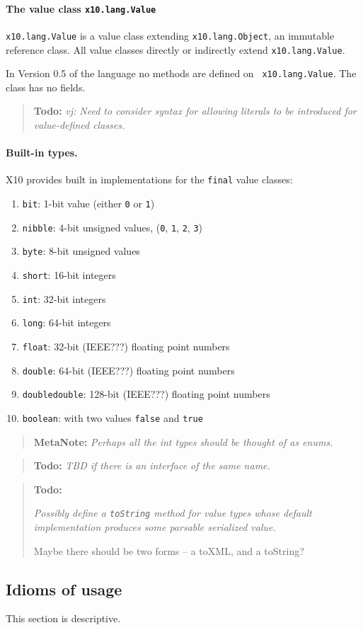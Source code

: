 \documentclass{article}
\def\ccfont{\sf}
\def\X10{{\ccfont X10}}
\newcommand \todo[1] {\begin{quotation}{\bf Todo:} {\footnotesize\em #1}\end{quotation}}
\newcommand \metanote[1] {\begin{quotation}{\bf MetaNote:} {\footnotesize\em #1}\end{quotation}}
\begin{document}
\paragraph{The value class {\tt x10.lang.Value}}

{\tt x10.lang.Value} is a value class extending {\tt x10.lang.Object},
an immutable reference class.  All value classes directly or
indirectly extend {\tt x10.lang.Value}.

In Version 0.5 of the language no methods are defined on {\tt
x10.lang.Value}. The class has no fields.

\todo{vj: Need to consider syntax for allowing literals to be
 introduced for value-defined classes.}

\paragraph{Built-in types.}
\X10{} provides built in implementations for the {\tt final} value classes:
\begin{enumerate}
\item {\tt bit}: 1-bit value (either {\tt 0} or {\tt 1})
\item {\tt nibble}: 4-bit unsigned values, ({\tt 0}, {\tt 1}, {\tt 2}, {\tt 3})
\item {\tt byte}: 8-bit unsigned values
\item {\tt short}: 16-bit integers
\item {\tt int}: 32-bit integers
\item {\tt long}: 64-bit integers
\item {\tt float}: 32-bit (IEEE???) floating point numbers
\item {\tt double}: 64-bit (IEEE???) floating point numbers
\item {\tt doubledouble}: 128-bit (IEEE???) floating point numbers
\item {\tt boolean}: with two values {\tt false} and {\tt true}
\end{enumerate}

\metanote{Perhaps all the int types should be thought of as enums.}

\todo{TBD if there is an interface of the same name.}

\todo{Possibly define a {\tt toString} method for value types whose
default implementation produces some parsable serialized value.

Maybe there should be two forms -- a toXML, and a toString?
}


\subsection{Idioms of usage}
This section is descriptive.
\end{document}
